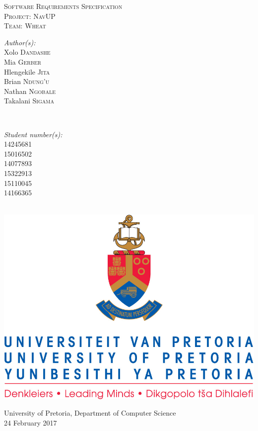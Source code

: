 \documentclass[a4paper,12pt]{article}
\begin{document}
\begin{titlepage}
\center

\textsc{\LARGE Software Requirements Specification}\\[1.5cm]
\textsc{\Large Project: NavUP}\\[0.5cm]
\textsc{\large Team: Wheat}\\[0.5cm]

\begin{minipage}{0.4\textwidth}
\begin{flushleft} \large
\emph{Author(s):}\\
Xolo \textsc{Dandashe}\\
Mia \textsc{Gerber}\\
Hlengekile \textsc{Jita}\\
Brian \textsc{Ndung'u}\\
Nathan \textsc{Ngobale}\\
Takalani \textsc{Sigama}\\
\end{flushleft}
\end{minipage}
~
\begin{minipage}{0.4\textwidth}
\begin{flushright} \large
\emph{Student number(s):} \\
14245681\\ %
15016502\\
14077893\\
15322913\\
15110045\\
14166365\\
\end{flushright}
\end{minipage}\\

\includegraphics[width=\textwidth]{images/up_logo.jpg}

{\large University of Pretoria, Department of Computer Science}\\[0.5cm]
{\large 24 February 2017}\\[3cm]

\vfil
\end{titlepage}
\end{document}

